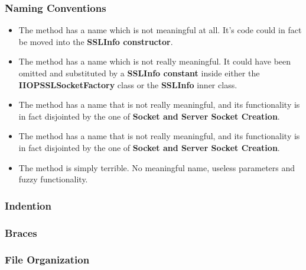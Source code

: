\subsubsection{Naming Conventions}
\begin{itemize}
		\begin{itemize}
			\item
			The method
			has a name which is not meaningful at all.
			It's code could in fact be moved into the \textbf{SSLInfo constructor}.
			\item
			The method
			has a name which is not really meaningful.
			It could have been omitted and substituted by a \textbf{SSLInfo constant} inside either the \textbf{IIOPSSLSocketFactory} class or the \textbf{SSLInfo} inner class.
			\item
			The method
			has a name that is not really meaningful, and its functionality is in fact disjointed by the one of \textbf{Socket and Server Socket Creation}.
			\item
			The method 
			has a name that is not really meaningful, and its functionality is in fact disjointed by the one of \textbf{Socket and Server Socket Creation}.
			\item
			The method
			is simply terrible.
			No meaningful name, useless parameters and fuzzy functionality.
		\end{itemize}
\end{itemize}

\subsubsection{Indention}
\begin{itemize}
\end{itemize}

\subsubsection{Braces}
\begin{itemize}
\end{itemize}

\subsubsection{File Organization}
\begin{itemize}
\end{itemize}

